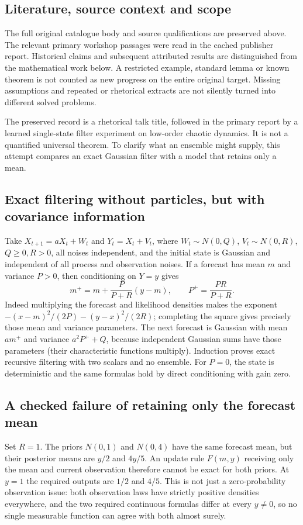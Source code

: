 \documentclass[11pt]{article}
\begin{document}
\subsection{Literature, source context and scope}
The full original catalogue body and source qualifications are preserved above. The relevant primary workshop passages were read in the cached publisher report. Historical claims and subsequent attributed results are distinguished from the mathematical work below. A restricted example, standard lemma or known theorem is not counted as new progress on the entire original target. Missing assumptions and repeated or rhetorical extracts are not silently turned into different solved problems.

The preserved record is a rhetorical talk title, followed in the primary report by a learned single-state filter experiment on low-order chaotic dynamics. It is not a quantified universal theorem. To clarify what an ensemble might supply, this attempt compares an exact Gaussian filter with a model that retains only a mean.
\subsection{Exact filtering without particles, but with covariance information}
Take $X_{t+1}=aX_t+W_t$ and $Y_t=X_t+V_t$, where $W_t\sim N(0,Q)$, $V_t\sim N(0,R)$, $Q\ge0,R>0$, all noises independent, and the initial state is Gaussian and independent of all process and observation noises. If a forecast has mean $m$ and variance $P>0$, then conditioning on $Y=y$ gives
\[
 m^+=m+\frac{P}{P+R}(y-m),\qquad P^+=\frac{PR}{P+R}.
\]
Indeed multiplying the forecast and likelihood densities makes the exponent
$-(x-m)^2/(2P)-(y-x)^2/(2R)$; completing the square gives precisely those mean and variance parameters. The next forecast is Gaussian with mean $am^+$ and variance $a^2P^++Q$, because independent Gaussian sums have those parameters (their characteristic functions multiply). Induction proves exact recursive filtering with two scalars and no ensemble. For $P=0$, the state is deterministic and the same formulas hold by direct conditioning with gain zero.
\subsection{A checked failure of retaining only the forecast mean}
Set $R=1$. The priors $N(0,1)$ and $N(0,4)$ have the same forecast mean, but their posterior means are $y/2$ and $4y/5$. An update rule $F(m,y)$ receiving only the mean and current observation therefore cannot be exact for both priors. At $y=1$ the required outputs are $1/2$ and $4/5$. This is not just a zero-probability observation issue: both observation laws have strictly positive densities everywhere, and the two required continuous formulas differ at every $y\ne0$, so no single measurable function can agree with both almost surely.
\end{document}
